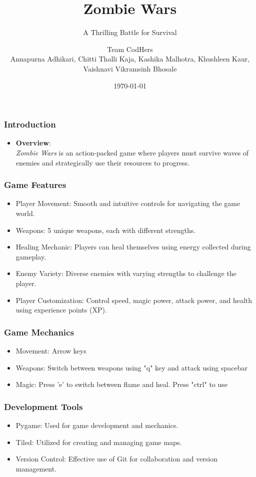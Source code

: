 \documentclass{beamer}
\title{Zombie Wars}
\subtitle{A Thrilling Battle for Survival}
\author{Team CodHers\\Annapurna Adhikari, Chitti Thalli Kaja, Kashika Malhotra, Khushleen Kaur, Vaishnavi Vikramsinh Bhosale}
\date{\today}
\begin{document}
\frame{\titlepage}

\begin{frame}
\frametitle{Introduction}
\begin{itemize}
  \item \textbf{Overview}: 
  \\\textit{Zombie Wars} is an action-packed game where players must survive waves of enemies and strategically use their resources to progress.
\end{itemize}
\end{frame}

\begin{frame}
\frametitle{Game Features}
\begin{itemize}
  \item Player Movement: Smooth and intuitive controls for navigating the game world.
  \item Weapons: 5 unique weapons, each with different strengths.
  \item Healing Mechanic: Players can heal themselves using energy collected during gameplay.
  \item Enemy Variety: Diverse enemies with varying strengths to challenge the player.
  \item Player Customization: Control speed, magic power, attack power, and health using experience points (XP).
\end{itemize}
\end{frame}

\begin{frame}
\frametitle{Game Mechanics}
\begin{itemize}
  \item Movement: Arrow keys 
  \item Weapons: Switch between weapons using "q" key and attack using spacebar
  \item Magic: Press 'e' to switch between flame and heal. Press "ctrl" to use
\end{itemize}
\end{frame}


\begin{frame}
\frametitle{Development Tools}
\begin{itemize}
  \item Pygame: Used for game development and mechanics.
  \item Tiled: Utilized for creating and managing game maps.
  \item Version Control: Effective use of Git for collaboration and version management.
\end{itemize}
\end{frame}
\end{document}
